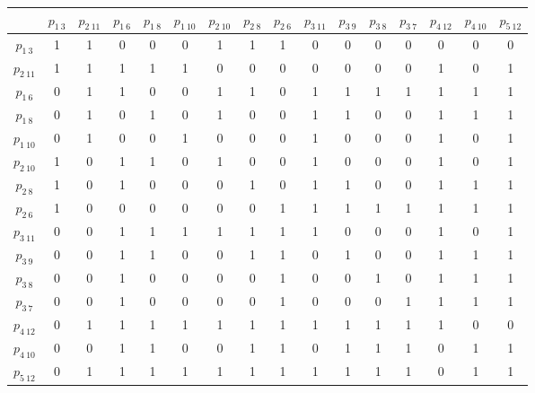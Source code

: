 \documentclass[a4paper,12pt]{article}
\begin{document}
\begin{table}[H]
    \raggedleft
    \begin{tabular}{|c|c|c|c|c|c|c|c|c|c|c|c|c|c|c|c|}
    \hline
         & $p_{1\ 3}$ & $p_{2\ 11}$ & $p_{1\ 6}$ & $p_{1\ 8}$ & $p_{1\ 10}$ & $p_{2\ 10}$ & $p_{2\ 8}$ & $p_{2\ 6}$ & $p_{3\ 11}$ & $p_{3\ 9}$ & $p_{3\ 8}$ & $p_{3\ 7}$ & $p_{4\ 12}$ & $p_{4\ 10}$ & $p_{5\ 12}$ \\ \hline
        $p_{1\ 3}$ & 1 & 1 & 0 & 0 & 0 & 1 & 1 & 1 & 0 & 0 & 0 & 0 & 0 & 0 & 0 \\ \hline
        $p_{2\ 11}$ & 1 & 1 & 1 & 1 & 1 & 0 & 0 & 0 & 0 & 0 & 0 & 0 & 1 & 0 & 1 \\ \hline
        $p_{1\ 6}$ & 0 & 1 & 1 & 0 & 0 & 1 & 1 & 0 & 1 & 1 & 1 & 1 & 1 & 1 & 1 \\ \hline
        $p_{1\ 8}$ & 0 & 1 & 0 & 1 & 0 & 1 & 0 & 0 & 1 & 1 & 0 & 0 & 1 & 1 & 1 \\ \hline
        $p_{1\ 10}$ & 0 & 1 & 0 & 0 & 1 & 0 & 0 & 0 & 1 & 0 & 0 & 0 & 1 & 0 & 1 \\ \hline
        $p_{2\ 10}$ & 1 & 0 & 1 & 1 & 0 & 1 & 0 & 0 & 1 & 0 & 0 & 0 & 1 & 0 & 1 \\ \hline
        $p_{2\ 8}$ & 1 & 0 & 1 & 0 & 0 & 0 & 1 & 0 & 1 & 1 & 0 & 0 & 1 & 1 & 1 \\ \hline
        $p_{2\ 6}$ & 1 & 0 & 0 & 0 & 0 & 0 & 0 & 1 & 1 & 1 & 1 & 1 & 1 & 1 & 1 \\ \hline
        $p_{3\ 11}$ & 0 & 0 & 1 & 1 & 1 & 1 & 1 & 1 & 1 & 0 & 0 & 0 & 1 & 0 & 1 \\ \hline
        $p_{3\ 9}$ & 0 & 0 & 1 & 1 & 0 & 0 & 1 & 1 & 0 & 1 & 0 & 0 & 1 & 1 & 1 \\ \hline
        $p_{3\ 8}$ & 0 & 0 & 1 & 0 & 0 & 0 & 0 & 1 & 0 & 0 & 1 & 0 & 1 & 1 & 1 \\ \hline
        $p_{3\ 7}$ & 0 & 0 & 1 & 0 & 0 & 0 & 0 & 1 & 0 & 0 & 0 & 1 & 1 & 1 & 1 \\ \hline
        $p_{4\ 12}$ & 0 & 1 & 1 & 1 & 1 & 1 & 1 & 1 & 1 & 1 & 1 & 1 & 1 & 0 & 0 \\ \hline
        $p_{4\ 10}$ & 0 & 0 & 1 & 1 & 0 & 0 & 1 & 1 & 0 & 1 & 1 & 1 & 0 & 1 & 1 \\ \hline
        $p_{5\ 12}$ & 0 & 1 & 1 & 1 & 1 & 1 & 1 & 1 & 1 & 1 & 1 & 1 & 0 & 1 & 1 \\ \hline
    \end{tabular}
\end{table}
\end{document}
